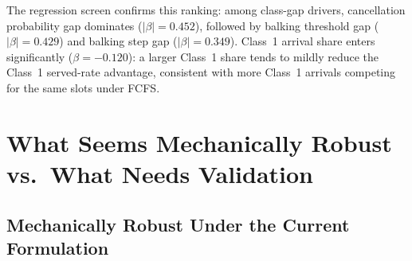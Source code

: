 \documentclass[11pt]{article}
\begin{document}
The regression screen confirms this ranking: among class-gap drivers,
cancellation probability gap dominates ($|\beta| = 0.452$), followed by
balking threshold gap ($|\beta| = 0.429$) and balking step gap
($|\beta| = 0.349$). Class~1 arrival share enters significantly
($\beta = -0.120$): a larger Class~1 share tends to mildly reduce the
Class~1 served-rate advantage, consistent with more Class~1 arrivals
competing for the same slots under FCFS.

\section{What Seems Mechanically Robust vs.\ What Needs Validation}
\label{sec:checks}

\subsection{Mechanically Robust Under the Current Formulation}
\end{document}
